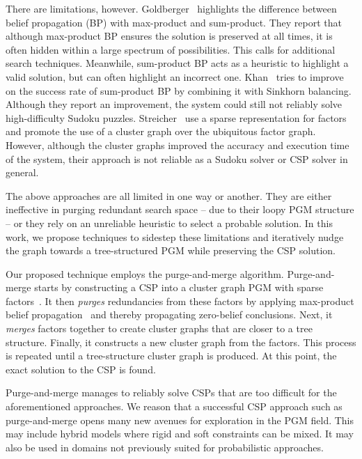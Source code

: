 \documentclass{ieeeaccess}
\begin{document}
There are limitations, however. Goldberger~\cite{GoldbergerJ} highlights the difference between belief propagation (BP) with max-product and sum-product. They report that although max-product BP ensures the solution is preserved at all times, it is often hidden within a large spectrum of possibilities. This calls for additional search techniques. Meanwhile, sum-product BP acts as a heuristic to highlight a valid solution, but can often highlight an incorrect one. Khan~\cite{KhanS} tries to improve on the success rate of sum-product BP by combining it with Sinkhorn balancing. Although they report an improvement, the system could still not reliably solve high-difficulty Sudoku puzzles. Streicher~\cite{streicher} use a sparse representation for factors and promote the use of a cluster graph over the ubiquitous factor graph. However, although the cluster graphs improved the accuracy and execution time of the system, their approach is not reliable as a Sudoku solver or CSP solver in general.

The above approaches are all limited in one way or another. They are either ineffective in purging redundant search space -- due to their loopy PGM structure -- or they rely on an unreliable heuristic to select a probable solution. In this work, we propose techniques to sidestep these limitations and iteratively nudge the graph towards a tree-structured PGM while preserving the CSP solution.

Our proposed technique employs the purge-and-merge algorithm. Purge-and-merge starts by constructing a CSP into a cluster graph PGM with sparse factors~\cite{streicher}. It then \textit{purges} redundancies from these factors by applying max-product belief propagation~\cite{dechter2010on} and thereby propagating zero-belief conclusions. Next, it \textit{merges} factors together to create cluster graphs that are closer to a tree structure. Finally, it constructs a new cluster graph from the factors. This process is repeated until a tree-structure cluster graph is produced. At this point, the exact solution to the CSP is found.

Purge-and-merge manages to reliably solve CSPs that are too difficult for the aforementioned approaches. We reason that a successful CSP approach such as purge-and-merge opens many new avenues for exploration in the PGM field. This may include hybrid models where rigid and soft constraints can be mixed. It may also be used in domains not previously suited for probabilistic approaches.
\end{document}
